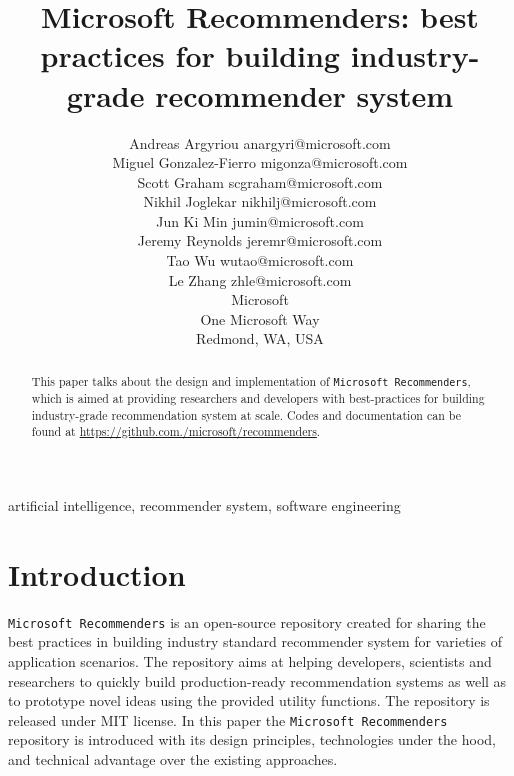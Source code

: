 \documentclass[twoside,11pt]{article}
\begin{document}
\title{Microsoft Recommenders: best practices for building industry-grade recommender system}

\author{\name Andreas Argyriou \email anargyri@microsoft.com \\
  \name Miguel Gonzalez-Fierro \email migonza@microsoft.com \\
  \name Scott Graham \email scgraham@microsoft.com \\
  \name Nikhil Joglekar \email nikhilj@microsoft.com \\
  \name Jun Ki Min \email jumin@microsoft.com \\
  \name Jeremy Reynolds \email jeremr@microsoft.com \\
  \name Tao Wu \email wutao@microsoft.com \\
  \name Le Zhang \email zhle@microsoft.com \\
  \addr Microsoft \\
  One Microsoft Way \\
  Redmond, WA, USA
}


\maketitle

\begin{abstract}%
  This paper talks about the design and implementation of \verb|Microsoft Recommenders|, which is aimed at providing researchers and developers with best-practices for building  industry-grade recommendation system at scale. Codes and documentation can be found at \url{https://github.com./microsoft/recommenders}. 
\end{abstract}

\begin{keywords}
  artificial intelligence, recommender system, software engineering
\end{keywords}

\section{Introduction}
\verb|Microsoft Recommenders| is an open-source repository created for sharing the best practices in building industry standard recommender system for varieties of application scenarios. The repository aims at helping developers, scientists and researchers to quickly build production-ready recommendation systems as well as to prototype novel ideas using the provided utility functions. The repository is released under MIT license. In this paper the \verb|Microsoft Recommenders| repository is introduced with its design principles, technologies under the hood, and technical advantage over the existing approaches.
\end{document}
